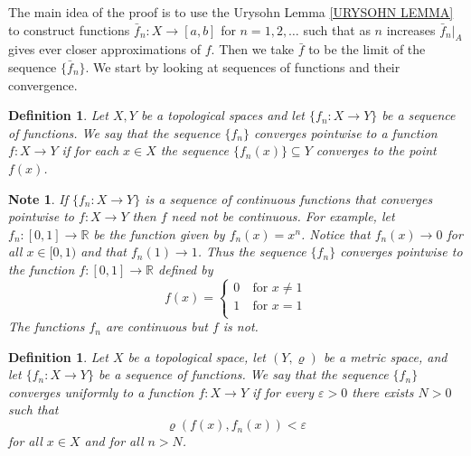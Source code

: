 \documentclass[11pt, letterpaper, oneside]{report}
\theoremstyle{pplain}
\newtheorem{ITERMVALUE THM}[theorem]{Intermediate Value Theorem}
\newtheorem{HEINEBOREL THM}[theorem]{Heine-Borel Theorem}
\newtheorem{UMETR THM}[theorem]{Urysohn Metrization Theorem}
\newtheorem{UMETR2 THM}[theorem]{Urysohn Metrization Theorem (v.2)}
\theoremstyle{ddefinition}
\newtheorem{definition}[theorem]{Definition}
\newtheorem{note}[theorem]{Note}
\theoremstyle{nnn}
\newtheorem{TDA NN}[theorem]{Topological Data Analysis. }
\theoremstyle{eexercise}
\newcommand{\R}{{\mathbb R}}
\begin{document}
The main idea of the proof is to use the Urysohn Lemma \ref{URYSOHN LEMMA} to construct functions
$\bar{f}_{n}\colon X \to [a, b]$ for $n=1, 2, \dots$ such that as $n$ increases $\bar{f}_{n}|_{A}$ gives 
ever closer approximations of $f$. Then we  take $\bar{f}$ to be the limit of the sequence  
$\{\bar{f}_{n}\}$.  We  start by looking at sequences of functions and their convergence.  

\begin{definition}
Let $X, Y$ be a topological spaces and let $\{f_{n}\colon X\to Y\}$ be a sequence of functions. 
We say that the sequence $\{f_{n}\}$ \emph{converges pointwise} to a function $f\colon X\to Y$ 
if for each $x\in X$ the sequence  $\{f_{n}(x)\}\subseteq Y$ converges to the point $f(x)$. 
\end{definition}  
 
 
\begin{note}
If $\{f_{n}\colon X\to Y\}$ is a sequence of continuous functions that converges pointwise 
to $f\colon X\to Y$ then $f$ need not be continuous.  For example, let  
$f_{n}\colon [0, 1]\to \R$ be the function given by $f_{n}(x) = x^{n}$. Notice that 
 $f_{n}(x) \to 0$ for  all $x\in [0, 1)$ and that  $f_{n}(1) \to  1$. Thus the sequence $\{f_{n}\}$ converges
 pointwise to  the function $f\colon [0, 1]\to \R$ defined by
 $$
 f(x) = 
 \begin{cases}
 0 & \ \text{for } x\neq 1 \\
 1 & \ \text{for } x=1 \\
 \end{cases}
 $$
 The functions $f_{n}$ are continuous but $f$ is not. 
 \end{note}
 
 
\begin{definition}
Let $X$ be a topological space,  let $(Y, \varrho)$ be a metric space, and
let $\{f_{n}\colon X\to Y\}$ be a sequence of functions. We say that the sequence 
$\{f_{n}\}$ \emph{converges uniformly} to a function $f\colon X\to Y$ if for every $\varepsilon>0$
there exists $N>0$ such that 
$$\varrho(f(x), f_{n}(x)) < \varepsilon$$
for all $x\in X$ and for all $n> N$. 
\end{definition}
\end{document}
